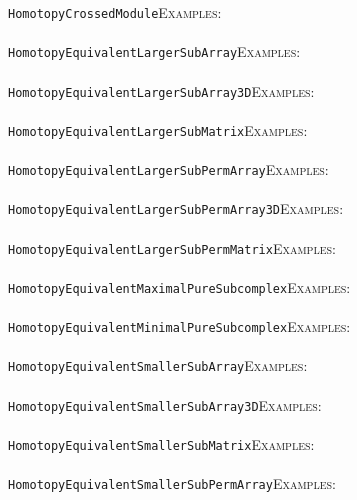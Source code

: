 \documentclass[a4paper,11pt]{report}
\begin{document}
{{ \texttt{HomotopyCrossedModule}{\nobreakspace}{\nobreakspace}{\nobreakspace}{\nobreakspace}\textsc{Examples:} \\
 \\
 \texttt{HomotopyEquivalentLargerSubArray}{\nobreakspace}{\nobreakspace}{\nobreakspace}{\nobreakspace}\textsc{Examples:} \\
 \\
 \texttt{HomotopyEquivalentLargerSubArray3D}{\nobreakspace}{\nobreakspace}{\nobreakspace}{\nobreakspace}\textsc{Examples:} \\
 \\
 \texttt{HomotopyEquivalentLargerSubMatrix}{\nobreakspace}{\nobreakspace}{\nobreakspace}{\nobreakspace}\textsc{Examples:} \\
 \\
 \texttt{HomotopyEquivalentLargerSubPermArray}{\nobreakspace}{\nobreakspace}{\nobreakspace}{\nobreakspace}\textsc{Examples:} \\
 \\
 \texttt{HomotopyEquivalentLargerSubPermArray3D}{\nobreakspace}{\nobreakspace}{\nobreakspace}{\nobreakspace}\textsc{Examples:} \\
 \\
 \texttt{HomotopyEquivalentLargerSubPermMatrix}{\nobreakspace}{\nobreakspace}{\nobreakspace}{\nobreakspace}\textsc{Examples:} \\
 \\
 \texttt{HomotopyEquivalentMaximalPureSubcomplex}{\nobreakspace}{\nobreakspace}{\nobreakspace}{\nobreakspace}\textsc{Examples:} \\
 \\
 \texttt{HomotopyEquivalentMinimalPureSubcomplex}{\nobreakspace}{\nobreakspace}{\nobreakspace}{\nobreakspace}\textsc{Examples:} \\
 \\
 \texttt{HomotopyEquivalentSmallerSubArray}{\nobreakspace}{\nobreakspace}{\nobreakspace}{\nobreakspace}\textsc{Examples:} \\
 \\
 \texttt{HomotopyEquivalentSmallerSubArray3D}{\nobreakspace}{\nobreakspace}{\nobreakspace}{\nobreakspace}\textsc{Examples:} \\
 \\
 \texttt{HomotopyEquivalentSmallerSubMatrix}{\nobreakspace}{\nobreakspace}{\nobreakspace}{\nobreakspace}\textsc{Examples:} \\
 \\
 \texttt{HomotopyEquivalentSmallerSubPermArray}{\nobreakspace}{\nobreakspace}{\nobreakspace}{\nobreakspace}\textsc{Examples:} \\
}}
\end{document}
